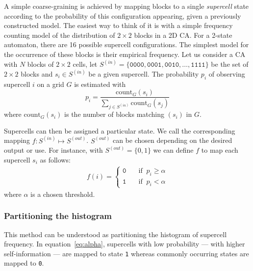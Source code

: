 A simple coarse-graining is achieved by mapping blocks to a single
\emph{supercell} state according to the probability of this configuration
appearing, given a previously constructed model. The easiest way to think of it
is with a simple frequency counting model of the distribution of $2\times 2$
blocks in a 2D CA\@. For a 2-state automaton, there are 16 possible supercell
configurations. The simplest model for the occurrence of these blocks is their
empirical frequency. Let us consider a CA with $N$ blocks of $2\times 2$ cells,
let $S^{(in)} = \{\mathtt{0000}, \mathtt{0001}, \mathtt{0010}, \ldots,
\mathtt{1111}\}$ be the set of $2\times 2$ blocks and $s_i \in S^{(in)}$ be a
given supercell. The probability $p_i$ of observing supercell $i$ on a grid $G$
is estimated with
\begin{equation}
  p_i = \dfrac{\text{count}_G(s_i)}{\sum_{j\in S^{(in)}}\text{count}_G(s_j)}
  \label{eq:stat_est}
\end{equation}
where $\text{count}_G(s_i)$ is the number of blocks matching $(s_i)$ in $G$.

Supercells can then be assigned a particular state. We call the corresponding
mapping $f: S^{(in)} \mapsto S^{(out)}$. $S^{(out)}$ can be chosen depending on
the desired output or use. For instance, with $S^{(out)} = \{0, 1\}$ we can
define $f$ to map each supercell $s_i$ as follows:
\begin{align}
  f(i) = \begin{cases}
    \mathtt{0} &\quad\text{if }\ p_i\geq \alpha\\
    \mathtt{1} &\quad\text{if }\ p_i< \alpha
  \end{cases}
        \label{eq:alpha}
\end{align}
where $\alpha$ is a chosen threshold.

\subsubsection{Partitioning the histogram}
This method can be understood as partitioning the histogram of supercell
frequency. In equation~\eqref{eq:alpha}, supercells with low probability
--- with higher self-information --- are mapped to state \texttt{1} whereas
commonly occurring states are mapped to \texttt{0}.

